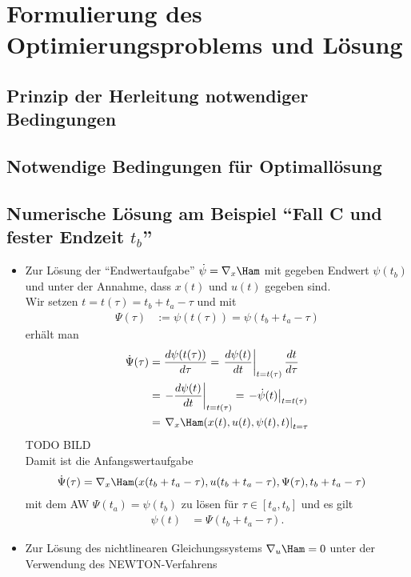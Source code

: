 \section{Formulierung des Optimierungsproblems und Lösung}


\subsection{Prinzip der Herleitung notwendiger Bedingungen}

\subsection{Notwendige Bedingungen für Optimallösung}

\subsection{Numerische Lösung am Beispiel "`Fall C und fester Endzeit $t_b$"'}
\begin{itemize}
  \item Zur Lösung der "`Endwertaufgabe"' $\dot{\psi}=\nabla_x \Ham$ mit gegeben Endwert $\psi(t_b)$ und unter der Annahme, dass $x(t)$ und $u(t)$ gegeben sind.\\
  		Wir setzen $t=t(\tau)=t_b+t_a-\tau$ und mit 
  		\begin{align*}
  			\Psi(\tau) & := \psi(t(\tau)) = \psi(t_b+t_a-\tau)
  		\end{align*}
  		erhält man 
  		\begin{align*}
  			\dot{\Psi}(\tau) & = \frac{d\psi(t(\tau))}{d\tau} = \left.\frac{d\psi(t)}{dt}\right|_{t=t(\tau)}\frac{dt}{d\tau}\\
  			& = \left.-\frac{d\psi(t)}{dt}\right|_{t=t(\tau)}=\left.-\dot{\psi}(t)\right|_{t=t(\tau)}\\
  			& = \left.\nabla_x \Ham(x(t),u(t),\psi(t),t)\right|_{t=\tau}
  		\end{align*}
  		TODO BILD\\
  		Damit ist die Anfangswertaufgabe 
  		\begin{align*}
  			\dot{\Psi}(\tau) & = \nabla_x \Ham(x(t_b+t_a-\tau),u(t_b+t_a-\tau),\Psi(\tau),t_b+t_a-\tau)
  		\end{align*}
  		mit dem \ac{AW} $\Psi(t_a)=\psi(t_b)$ zu lösen für $\tau\in[t_a,t_b]$ und es gilt
  		\begin{align*}
  		\psi(t) & = \Psi(t_b+t_a-\tau).
  		\end{align*}
  \item Zur Lösung des nichtlinearen Gleichungssystems $\nabla_u \Ham =0$ unter der Verwendung des NEWTON-Verfahrens
\end{itemize}

